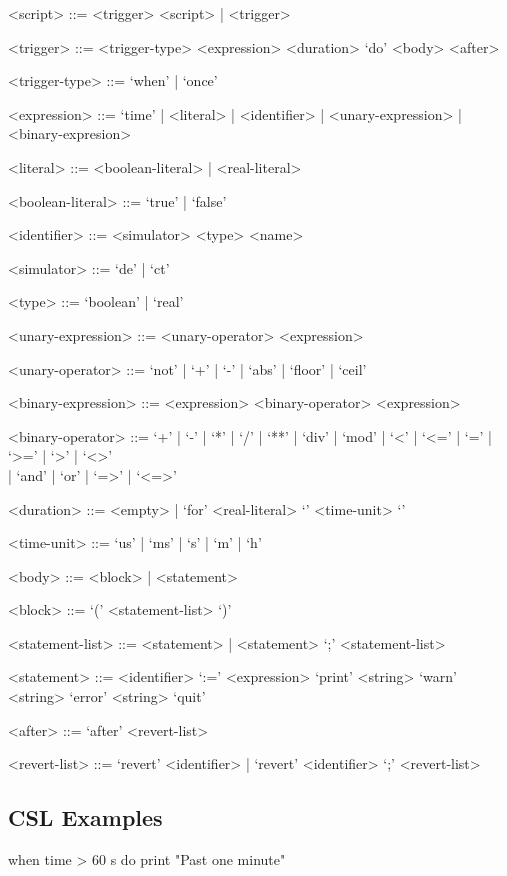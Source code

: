 \documentclass{crescendorepchap}
\begin{document}
\begin{grammar}
<script> ::= <trigger> <script> | <trigger>

<trigger> ::= <trigger-type> <expression> <duration> `do' <body> <after>

<trigger-type> ::= `when' | `once'

<expression> ::= `time' | <literal> | <identifier> | <unary-expression> | <binary-expresion>

<literal> ::= <boolean-literal> | <real-literal>

<boolean-literal> ::= `true' | `false'

<identifier> ::= <simulator> <type> <name>

<simulator> ::= `de' | `ct'

<type> ::= `boolean' | `real'

<unary-expression> ::= <unary-operator> <expression>

<unary-operator> ::= `not' | `+' | `-' | `abs' | `floor' | `ceil'

<binary-expression> ::= <expression> <binary-operator> <expression>

<binary-operator> ::= `+' | `-' | `*' | `/' | `**' | `div' | `mod' | `<' | `<=' | `=' | `>=' | `>' | `<>' \\| `and' | `or' | `=>' | `<=>'

<duration> ::= <empty> | `for' <real-literal> `{' <time-unit> `}'

<time-unit> ::= `us' | `ms' | `s' | `m' | `h'

<body> ::= <block> | <statement>

<block> ::= `(' <statement-list> `)'

<statement-list> ::= <statement> | <statement> `;' <statement-list>

<statement> ::= <identifier> `:=' <expression>
 \alt `print' <string>
 \alt `warn' <string>
 \alt `error' <string>
 \alt `quit'

<after> ::= `after' <revert-list>

<revert-list> ::= `revert' <identifier> | `revert' <identifier> `;' <revert-list>
\end{grammar}

\subsection{CSL Examples}

\begin{dcl}
when time > 60 {s} do
  print "Past one minute"
\end{dcl}
\end{document}
